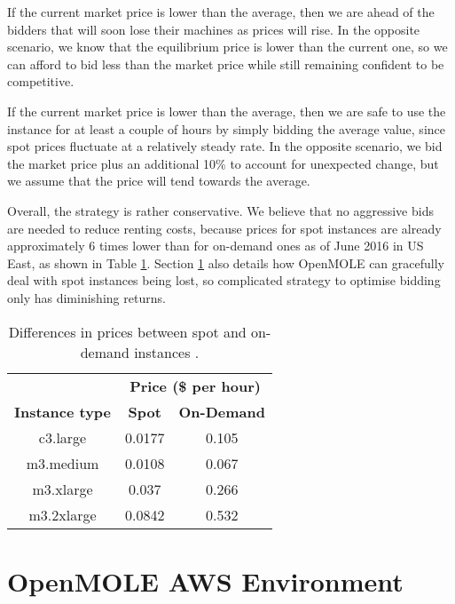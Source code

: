 If the current market price is lower than the average, then we are ahead of the bidders that will soon lose their machines as prices will rise. In the opposite scenario, we know that the equilibrium price is lower than the current one, so we can afford to bid less than the market price while still remaining confident to be competitive.

If the current market price is lower than the average, then we are safe to use the instance for at least a couple of hours by simply bidding the average value, since spot prices fluctuate at a relatively steady rate. In the opposite scenario, we bid the market price plus an additional 10\% to account for unexpected change, but we assume that the price will tend towards the average.

Overall, the strategy is rather conservative. We believe that no aggressive bids are needed to reduce renting costs, because prices for spot instances are already approximately 6 times lower than for on-demand ones as of June 2016 in US East, as shown in Table \ref{SpotPricing}. Section \ref{OpenMOLEAWSSection} also details how OpenMOLE can gracefully deal with spot instances being lost, so complicated strategy to optimise bidding only has diminishing returns.

\begin{table}[h]
\centering
\begin{tabular}{ccc}
\multicolumn{1}{l}{} & \multicolumn{2}{c}{\textbf{Price (\$ per hour)}} \\ \cline{2-3} 
\multicolumn{1}{c|}{\textbf{Instance type}} & \multicolumn{1}{c|}{\textbf{Spot}} & \multicolumn{1}{c|}{\textbf{On-Demand}} \\ \hline
\multicolumn{1}{|c|}{c3.large} & \multicolumn{1}{c|}{0.0177} & \multicolumn{1}{c|}{0.105} \\ \hline
\multicolumn{1}{|c|}{m3.medium} & \multicolumn{1}{c|}{0.0108} & \multicolumn{1}{c|}{0.067} \\ \hline
\multicolumn{1}{|c|}{m3.xlarge} & \multicolumn{1}{c|}{0.037} & \multicolumn{1}{c|}{0.266} \\ \hline
\multicolumn{1}{|c|}{m3.2xlarge} & \multicolumn{1}{c|}{0.0842} & \multicolumn{1}{c|}{0.532} \\ \hline
\end{tabular}
\caption{Differences in prices between spot and on-demand instances \cite{AWSPricing}.}
\label{SpotPricing}
\end{table}

\section{OpenMOLE AWS Environment} \label{OpenMOLEAWSSection}

